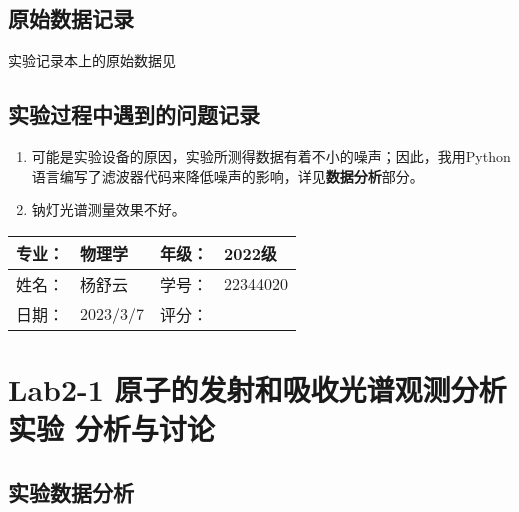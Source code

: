 \documentclass[dvipsnames, svgnames,a4paper,11pt]{article}
\begin{document}
	
	\clearpage
	\subsection{原始数据记录}
	实验记录本上的原始数据见%
	
	
	
	\subsection{实验过程中遇到的问题记录}
	\begin{enumerate}
		\item 可能是实验设备的原因，实验所测得数据有着不小的噪声；因此，我用Python语言编写了滤波器代码来降低噪声的影响，详见\textbf{数据分析}部分。
		\item 钠灯光谱测量效果不好。
	\end{enumerate}
	
	
	
	\clearpage
	
	\begin{table}
		\renewcommand\arraystretch{1.7}
		\begin{tabularx}{\textwidth}{|X|X|X|X|}
			\hline
			专业：& 物理学 &年级：& 2022级\\
			\hline
			姓名： & 杨舒云 & 学号：& 22344020\\
			\hline
			日期：& 2023/3/7 & 评分：& \\
			\hline
		\end{tabularx}
	\end{table}
	
	\section{Lab2-1 原子的发射和吸收光谱观测分析实验 \quad\heiti 分析与讨论}
	
	\subsection{实验数据分析}
	
\end{document}
